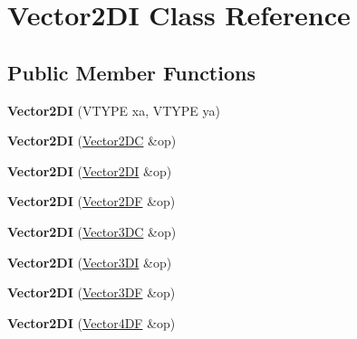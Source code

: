 \hypertarget{class_vector2_d_i}{\section{Vector2\+D\+I Class Reference}
\label{class_vector2_d_i}
}
\subsection*{Public Member Functions}
\begin{DoxyCompactItemize}
\item 
\hypertarget{class_vector2_d_i_a5c9bcc1695600f5bae0397c6c9b0524d}{{\bfseries Vector2\+D\+I} (V\+T\+Y\+P\+E xa, V\+T\+Y\+P\+E ya)}\label{class_vector2_d_i_a5c9bcc1695600f5bae0397c6c9b0524d}

\item 
\hypertarget{class_vector2_d_i_a454fe4101caf32f8ca90041690deb372}{{\bfseries Vector2\+D\+I} (\hyperlink{class_vector2_d_c}{Vector2\+D\+C} \&op)}\label{class_vector2_d_i_a454fe4101caf32f8ca90041690deb372}

\item 
\hypertarget{class_vector2_d_i_adf23a845818de0c49b1f6a1a6d70769e}{{\bfseries Vector2\+D\+I} (\hyperlink{class_vector2_d_i}{Vector2\+D\+I} \&op)}\label{class_vector2_d_i_adf23a845818de0c49b1f6a1a6d70769e}

\item 
\hypertarget{class_vector2_d_i_af81d874f5006a406bb13d56224106984}{{\bfseries Vector2\+D\+I} (\hyperlink{class_vector2_d_f}{Vector2\+D\+F} \&op)}\label{class_vector2_d_i_af81d874f5006a406bb13d56224106984}

\item 
\hypertarget{class_vector2_d_i_a73fca2ece93615cd62afc2063e37f106}{{\bfseries Vector2\+D\+I} (\hyperlink{class_vector3_d_c}{Vector3\+D\+C} \&op)}\label{class_vector2_d_i_a73fca2ece93615cd62afc2063e37f106}

\item 
\hypertarget{class_vector2_d_i_acd72cff07c3dfcba28fde3675d1d32da}{{\bfseries Vector2\+D\+I} (\hyperlink{class_vector3_d_i}{Vector3\+D\+I} \&op)}\label{class_vector2_d_i_acd72cff07c3dfcba28fde3675d1d32da}

\item 
\hypertarget{class_vector2_d_i_a7abf983e603347951313a0f9cd720959}{{\bfseries Vector2\+D\+I} (\hyperlink{class_vector3_d_f}{Vector3\+D\+F} \&op)}\label{class_vector2_d_i_a7abf983e603347951313a0f9cd720959}

\item 
\hypertarget{class_vector2_d_i_a4a5c38205fc24f31d0da7f8826264e23}{{\bfseries Vector2\+D\+I} (\hyperlink{class_vector4_d_f}{Vector4\+D\+F} \&op)}\label{class_vector2_d_i_a4a5c38205fc24f31d0da7f8826264e23}


\end{DoxyCompactItemize}

